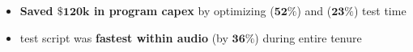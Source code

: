 \documentclass[11pt,a4paper]{article}  %
\begin{document}
\begin{ressection}
\begin{itemize}
        \setlength{\itemindent}{.25in}

            \item \textbf{Saved $\bm{\$120\text{k}}$ in program capex} by optimizing
                 ($\bm{52\%}$) and
                 ($\bm{23\%}$) test time

            \item {} test script was
                \textbf{fastest within  audio} (by $\bm{36\%}$) during entire tenure

        \setlength{\itemindent}{0in}

    \end{itemize}
\end{ressection}



\end{document}
